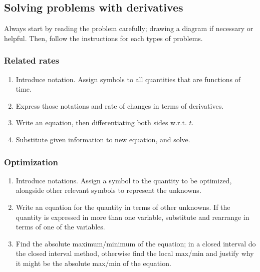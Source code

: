 \documentclass[main.tex]{subfiles}
\begin{document}
	\subsection*{Solving problems with derivatives}
	Always start by reading the problem carefully; drawing a diagram if necessary or helpful. Then, follow the instructions for each types of problems.
	\subsubsection*{Related rates}
	\begin{enumerate}
		\item Introduce notation. Assign symbols to all quantities that are functions of time.
		\item Express those notations and rate of changes in terms of derivatives.
		\item Write an equation, then differentiating both sides w.r.t. \(t\).
		\item Substitute given information to new equation, and solve.
	\end{enumerate}

	\subsubsection*{Optimization}
	\begin{enumerate}
		\item Introduce notations. Assign a symbol to the quantity to be optimized, alongside other relevant symbols to represent the unknowns.
		\item Write an equation for the quantity in terms of other unknowns. If the quantity is expressed in more than one variable, substitute and rearrange in terms of one of the variables.
		\item Find the absolute maximum/minimum of the equation; in a closed interval do the closed interval method, otherwise find the local max/min and justify why it might be the absolute max/min of the equation.
	\end{enumerate}


\ifSubfilesClassLoaded{%
\end{multicols}
}{}
\end{document}
